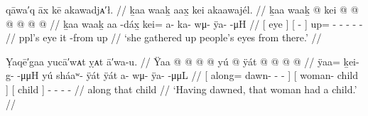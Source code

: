 

\ex\label{ex:94-10-took-peoples-eyes}%
%
\begingl
	\glpreamble	qāwa′q āx kē akawadjᴀ′ł. //
	\glpreamble	ḵaa waaḵ aax̱ kei akaawajél. //
	\gla	{} ḵaa waaḵ {} {}  @ {} {}
		kei @  @ {} @ {} @ {} @ {} @ {} //
	\glb	{} ḵaa waaḵ {} {} aa -dáx̱ {}
		kei= a- ka- wμ- ÿa-  -μH //
	\glc	{}[  eye {}] {}[  - {}]
		up= - - - -  - //
	\gld	{} ppl’s eye {} {} it -from {}
		up\•  {} {} {} {} {} //
	\glft	‘she gathered up people’s eyes from there.’
		//
\endgl
\xe


\ex\label{ex:94-11-dawn-woman-have-child}%
%
\begingl
	\glpreamble	Ỵaqē′gaa yucā′wᴀt ỵᴀt ā′wa-u. //
	\gla	{} Ÿaa  @ {} @ {} @ {} @ {} {}
		{} yú  @ {} {}
		{} ÿát {} 
		 @ {} @ {} @ {} @ {} //
	\glb	{} ÿaa= ḵei- g-  -μμH {} {}
		{} yú sháaʷ- ÿát {}
		{} ÿát {}
		a- wμ- ÿa-  -μμL //
	\glc	{}[ along= dawn- -  - \· {}]
		{}[  woman- child {}]
		{}[ child {}]
		- - -  - //
	\gld	{} along  {} {} {} {} {}
		{} that  {} {}
		{} child {}
		 {} {} {} {} //
	\glft	‘Having dawned, that woman had a child.’
		//
\endgl
\xe

